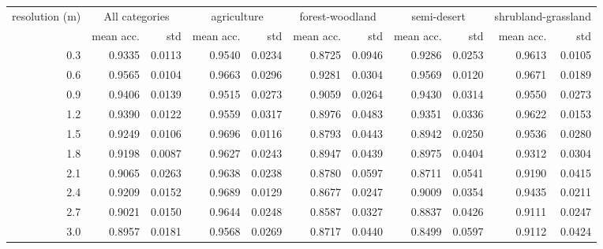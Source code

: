 \begin{tabular}{rrrrrrrrrrr}
\toprule
resolution (m) & \multicolumn{2}{c}{All categories} & \multicolumn{2}{c}{agriculture} & \multicolumn{2}{c}{forest-woodland} & \multicolumn{2}{c}{semi-desert} & \multicolumn{2}{c}{shrubland-grassland} \\
           &     mean acc. &    std &                 mean acc. &    std &                     mean acc. &    std &                 mean acc. &    std &                         mean acc. &    std \\
\midrule
       0.3 &   0.9335 & 0.0113 &               0.9540 & 0.0234 &                   0.8725 & 0.0946 &               0.9286 & 0.0253 &                       0.9613 & 0.0105 \\
       0.6 &   0.9565 & 0.0104 &               0.9663 & 0.0296 &                   0.9281 & 0.0304 &               0.9569 & 0.0120 &                       0.9671 & 0.0189 \\
       0.9 &   0.9406 & 0.0139 &               0.9515 & 0.0273 &                   0.9059 & 0.0264 &               0.9430 & 0.0314 &                       0.9550 & 0.0273 \\
       1.2 &   0.9390 & 0.0122 &               0.9559 & 0.0317 &                   0.8976 & 0.0483 &               0.9351 & 0.0336 &                       0.9622 & 0.0153 \\
       1.5 &   0.9249 & 0.0106 &               0.9696 & 0.0116 &                   0.8793 & 0.0443 &               0.8942 & 0.0250 &                       0.9536 & 0.0280 \\
       1.8 &   0.9198 & 0.0087 &               0.9627 & 0.0243 &                   0.8947 & 0.0439 &               0.8975 & 0.0404 &                       0.9312 & 0.0304 \\
       2.1 &   0.9065 & 0.0263 &               0.9638 & 0.0238 &                   0.8780 & 0.0597 &               0.8711 & 0.0541 &                       0.9190 & 0.0415 \\
       2.4 &   0.9209 & 0.0152 &               0.9689 & 0.0129 &                   0.8677 & 0.0247 &               0.9009 & 0.0354 &                       0.9435 & 0.0211 \\
       2.7 &   0.9021 & 0.0150 &               0.9644 & 0.0248 &                   0.8587 & 0.0327 &               0.8837 & 0.0426 &                       0.9111 & 0.0247 \\
       3.0 &   0.8957 & 0.0181 &               0.9568 & 0.0269 &                   0.8717 & 0.0440 &               0.8499 & 0.0597 &                       0.9112 & 0.0424 \\

\end{tabular}
